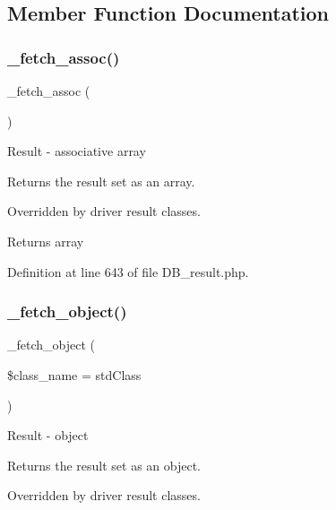 \subsection{Member Function Documentation}
\mbox{\label{class_c_i___d_b__result_a43a9a92817f1334a1c10752ec44275a0}} 
\subsubsection{\texorpdfstring{\_fetch\_assoc()}{\_fetch\_assoc()}}
{\footnotesize\ttfamily \+\_\+fetch\+\_\+assoc (\begin{DoxyParamCaption}{ }\end{DoxyParamCaption})\hspace{0.3cm}{\ttfamily [protected]}}

Result -\/ associative array

Returns the result set as an array.

Overridden by driver result classes.

\begin{DoxyReturn}{Returns}
array 
\end{DoxyReturn}


Definition at line 643 of file D\+B\+\_\+result.\+php.

\mbox{\label{class_c_i___d_b__result_a60806be6a9c2488820813c2a7f4fef71}} 
\subsubsection{\texorpdfstring{\_fetch\_object()}{\_fetch\_object()}}
{\footnotesize\ttfamily \+\_\+fetch\+\_\+object (\begin{DoxyParamCaption}\item[{}]{\$class\+\_\+name = {\ttfamily \textquotesingle{}stdClass\textquotesingle{}} }\end{DoxyParamCaption})\hspace{0.3cm}{\ttfamily [protected]}}

Result -\/ object

Returns the result set as an object.

Overridden by driver result classes.



